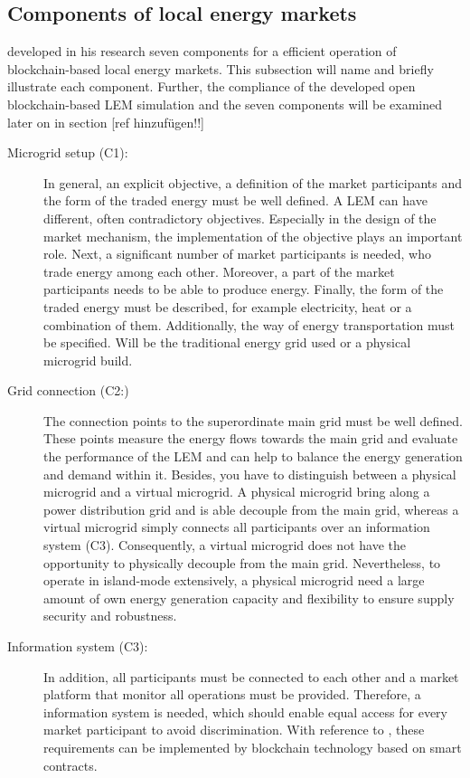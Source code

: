 \subsection{Components of local energy markets}
 developed in his research seven components for a efficient
operation of blockchain-based local energy markets. This subsection will name and briefly 
illustrate each component. Further, the compliance of the developed open blockchain-based
LEM simulation and the seven components will be examined later on in section [ref hinzufügen!!]

\begin{description}
    \item[Microgrid setup (C1):] In general, an explicit objective, a definition of the market 
     participants and the form of the traded energy must be well defined. 
     A LEM can have different, often contradictory objectives. Especially in the
     design of the market mechanism, the implementation of the objective plays an important role.
     Next, a significant number of market participants is needed, who trade energy among each other.
     Moreover, a part of the market participants needs to be able to produce energy. 
     Finally, the form of the traded energy must be described, for example electricity, heat or a 
     combination of them. Additionally, the way of energy transportation must be specified.
     Will be the traditional energy grid used or a physical microgrid build. 
    
    \item[Grid connection (C2:)] The connection points to the superordinate main grid 
     must be well defined. These points measure the energy flows towards the main grid 
     and evaluate the performance of the LEM and can help to balance the energy generation 
     and demand within it. Besides, you have to distinguish between a physical microgrid and 
     a virtual microgrid. A physical microgrid bring along a power distribution grid and is able
     decouple from the main grid, whereas a virtual microgrid simply connects all participants over 
     an information system (C3). Consequently, a virtual microgrid does not have the opportunity
     to physically decouple from the main grid. 
     Nevertheless, to operate in island-mode extensively, a physical microgrid need a large 
     amount of own energy generation capacity and flexibility to ensure supply security and robustness.
         
    \item[Information system (C3):] In addition, all participants must be connected to each other
    and a market platform that monitor all operations must be provided. 
    Therefore, a information system is needed, which should enable equal 
    access for every market participant to avoid discrimination. 
    With reference to , these requirements
    can be implemented by blockchain technology based on smart contracts.
    

\end{description}
